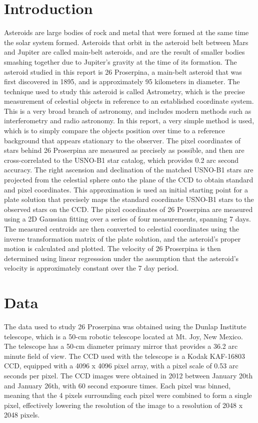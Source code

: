 \documentclass{article}
\begin{document}
\section{Introduction}
Asteroids are large bodies of rock and metal that were formed at the same time the solar system formed. Asteroids that orbit in the asteroid belt between Mars and Jupiter are called main-belt asteroids, and are the result of smaller bodies smashing together due to Jupiter's gravity at the time of its formation.
The asteroid studied in this report is 26 Proserpina, a main-belt asteroid that was first discovered in 1895, and is approximately 95 kilometers in diameter. The technique 
used to study this asteroid is called Astrometry, which is the precise measurement of celestial objects in reference to an established coordinate system. This is a very broad branch of 
astronomy, and includes modern methods such as interferometry and radio astronomy. In this report, a very simple method is used, which is to simply compare the objects position over time
to a reference background that appears stationary to the observer. The pixel coordinates of stars behind 26 Proserpina are measured as precisely as possible, and then are cross-correlated to the USNO-B1 
star catalog, which provides 0.2 arc second accuracy. The right ascension and declination of the matched USNO-B1 stars are projected from the celestial sphere onto the plane of the CCD to obtain standard and pixel coordinates. 
This approximation is used an initial starting point for a plate solution that precisely maps the standard coordinate USNO-B1 stars to the observed stars on the CCD. The pixel coordinates of 26 Proserpina are measured using a 2D Gaussian 
fitting over a series of four measurements, spanning 7 days. The measured centroids are then converted to celestial coordinates using the inverse transformation matrix of the plate solution, and the asteroid's proper motion is calculated and plotted. The velocity of
26 Proserpina is then determined using linear regresssion under the assumption that the asteroid's velocity is approximately constant over the 7 day period.

\newpage

\section{Data}
The data used to study 26 Proserpina was obtained using the Dunlap Institute telescope, which is a 50-cm robotic telescope located at Mt. Joy, New Mexico. The telescope has a 50-cm diameter primary mirror that provides a 36.2 arc minute field of view.  
The CCD used with the telescope is a Kodak KAF-16803 CCD, equipped with a 4096 x 4096 pixel array, with a pixel scale of 0.53 arc seconds per pixel. The CCD images were obtained in 2012 between January 20th and January 26th, with 60 second exposure times.
Each pixel was binned, meaning that the 4 pixels surrounding each pixel were combined to form a single pixel, effectively lowering the resolution of the image to a resolution of 2048 x 2048 pixels. 
\end{document}

